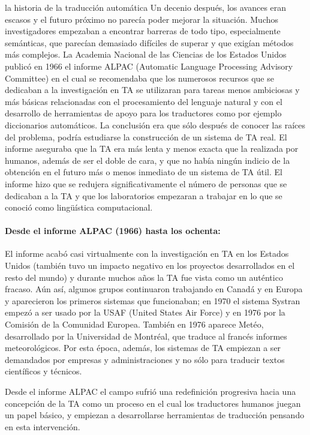 \begin{persabermes}{la historia de la traducción automática}
Un decenio después, los avances eran escasos y el futuro próximo no parecía poder mejorar la situación. Muchos investigadores empezaban a encontrar barreras de todo tipo, especialmente semánticas, que parecían demasiado difíciles de superar y que exigían métodos más complejos. La Academia Nacional de las Ciencias de los Estados Unidos publicó en 1966 el informe ALPAC (Automatic Language Processing Advisory Committee) en el cual se recomendaba que los numerosos recursos que se dedicaban a la investigación en TA se utilizaran para tareas menos ambiciosas y más básicas relacionadas con el procesamiento del lenguaje natural y con el desarrollo de herramientas de apoyo para los traductores como por ejemplo diccionarios automáticos. La conclusión era que sólo después de conocer las raíces del problema, podría estudiarse la construcción de un sistema de TA real. El informe aseguraba que la TA era más lenta y menos exacta que la realizada por humanos, además de ser el doble de cara, y que no había ningún indicio de la obtención en el futuro más o menos inmediato de un sistema de TA útil. El informe hizo que se redujera significativamente el número de personas que se dedicaban a la TA y que los laboratorios empezaran a trabajar en lo que se conoció como lingüística computacional. 

\paragraph{Desde el informe ALPAC (1966) hasta los ochenta:} El informe acabó casi virtualmente con la investigación en TA en los Estados Unidos (también tuvo un impacto negativo en los proyectos desarrollados en el resto del mundo) y durante muchos años la TA fue vista como un auténtico fracaso. Aún así, algunos grupos continuaron trabajando en Canadá y en Europa y aparecieron los primeros sistemas que funcionaban; en 1970 el sistema Systran empezó a ser usado por la USAF (United States Air Force) y en 1976 por la Comisión de la Comunidad Europea. También en 1976 aparece Metéo, desarrollado por la Universidad de Montréal, que traduce al francés informes meteorológicos. Por esta época, además, los sistemas de TA empiezan a ser demandados por empresas y administraciones y no sólo para traducir textos científicos y técnicos. 

Desde el informe ALPAC el campo sufrió una redefinición progresiva hacia una concepción de la TA como un proceso en el cual los traductores humanos juegan un papel básico, y empiezan a desarrollarse herramientas de traducción pensando en esta intervención. 


\end{persabermes}

